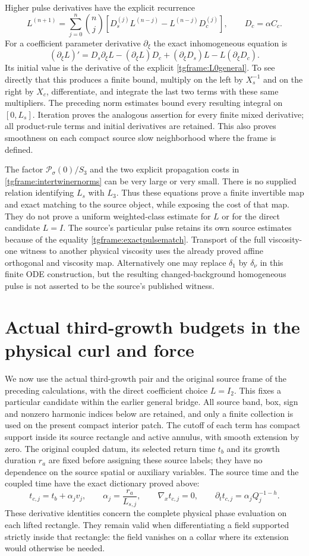 Higher pulse derivatives have the explicit recurrence
\[
 L^{(n+1)}=
 \sum_{j=0}^n\binom nj\left[
 D_s^{(j)}L^{(n-j)}-L^{(n-j)}D_c^{(j)}\right],
 \qquad D_c=\alpha C_c .
\]
For a coefficient parameter derivative $\partial_\xi$ the exact
inhomogeneous equation is
\[
 (\partial_\xi L)'=D_s\partial_\xi L
       -(\partial_\xi L)D_c
       +(\partial_\xi D_s)L-L(\partial_\xi D_c).
\]
Its initial value is the derivative of the explicit
\eqref{tgframe:L0general}. To see directly that this produces a finite
bound, multiply on the left by $X_s^{-1}$ and on the right by $X_c$,
differentiate, and integrate the last two terms with these same
multipliers. The preceding norm estimates bound every resulting
integral on $[0,L_s]$. Iteration proves the analogous assertion for
every finite mixed derivative; all product-rule terms and initial
derivatives are retained. This also proves smoothness on each compact
source slow neighborhood where the frame is defined.

The factor $\mathcal P_\sigma(0)/S_3$ and the two explicit propagation
costs in \eqref{tgframe:intertwinernorms} can be very large or very small.
There is no supplied relation identifying $L_s$ with $L_3$.
Thus these equations prove a finite invertible map and exact matching
to the source object, while exposing the cost of that map. They do not
prove a uniform weighted-class estimate for $L$ or for the direct
candidate $L=I$. The source's particular pulse retains its own source
estimates because of the equality \eqref{tgframe:exactpulsematch}.
Transport of the full viscosity-one witness to another physical
viscosity uses the already proved affine orthogonal and viscosity map.
Alternatively one may replace $\delta_1$ by $\delta_\nu$ in this
finite ODE construction, but the resulting changed-background
homogeneous pulse is not asserted to be the source's published witness.


\section{Actual third-growth budgets in the physical curl and force}
\label{tgq:section}
We now use the actual third-growth pair and the original source frame
of the preceding calculations, with the direct coefficient choice
$L=I_2$. This fixes a particular candidate within the earlier general
bridge. All source band, box, sign and nonzero harmonic indices below
are retained, and only a finite collection is used on the present compact
interior patch. The cutoff of each term has compact support inside its
source rectangle and active annulus, with smooth extension by zero.
The original coupled datum, its selected return time $t_b$ and its
growth duration $r_a$ are fixed before assigning these source labels;
they have no dependence on the source spatial or auxiliary variables.
The source time and the coupled time have the exact dictionary proved
above:
\[
 t_{c,j}=t_b+\alpha_jv_j,\qquad
 \alpha_j=\frac{r_a}{L_{s,j}},\qquad
 \nabla_x t_{c,j}=0,\qquad
 \partial_t t_{c,j}=\alpha_jQ_j^{-1-h}.
\]
These derivative identities concern the complete physical phase
evaluation on each lifted rectangle. They remain valid when differentiating
a field supported strictly inside that rectangle: the field vanishes on
a collar where its extension would otherwise be needed.

